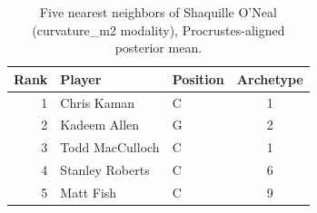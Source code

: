 \begin{table}[htbp]
  \centering\small
  \begin{tabular}{rllc}
    \toprule
    Rank & Player & Position & Archetype \\
    \midrule
    1 & Chris Kaman & C & 1 \\
    2 & Kadeem Allen & G & 2 \\
    3 & Todd MacCulloch & C & 1 \\
    4 & Stanley Roberts & C & 6 \\
    5 & Matt Fish & C & 9 \\
    \bottomrule
  \end{tabular}
  \caption{Five nearest neighbors of Shaquille O'Neal (curvature_m2 modality), Procrustes-aligned posterior mean.}
  \label{tab:Shaquille_O_Neal_neighbors_curvature_m2}
\end{table}

